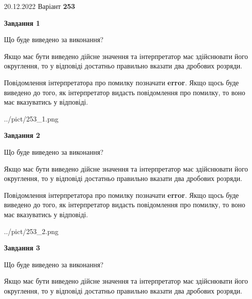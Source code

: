 \documentclass[12pt, ukrainian]{article}
\begin{document}
{20.12.2022 Варіант \No \textbf { 253 }\par}
{
\begin {Large}

{\begin {center}\textbf{Завдання 1}\end {center}}\par
Що буде виведено за виконання? \par

Якщо має бути виведено дійсне значення та інтерпретатор має здійснювати його округлення, 
то у відповіді достатньо правильно вказати два дробових розряди.

Повідомлення інтерпретатора про помилку позначати \textbf{error}.
Якщо щось буде виведено до того, як інтерпретатор видасть повідомлення про помилку, 
то воно має вказуватись у відповіді. \par

\begin{center}
	{../pict/253_1.png}
\end{center}
\newpage

{\begin {center}\textbf{Завдання 2}\end {center}}\par
Що буде виведено за виконання? \par

Якщо має бути виведено дійсне значення та інтерпретатор має здійснювати його округлення, 
то у відповіді достатньо правильно вказати два дробових розряди.

Повідомлення інтерпретатора про помилку позначати \textbf{error}.
Якщо щось буде виведено до того, як інтерпретатор видасть повідомлення про помилку, 
то воно має вказуватись у відповіді. \par

\begin{center}
	{../pict/253_2.png}
\end{center}
\newpage

{\begin {center}\textbf{Завдання 3}\end {center}}\par
Що буде виведено за виконання? \par

Якщо має бути виведено дійсне значення та інтерпретатор має здійснювати його округлення, 
то у відповіді достатньо правильно вказати два дробових розряди.


\end{Large}}
\end{document}
